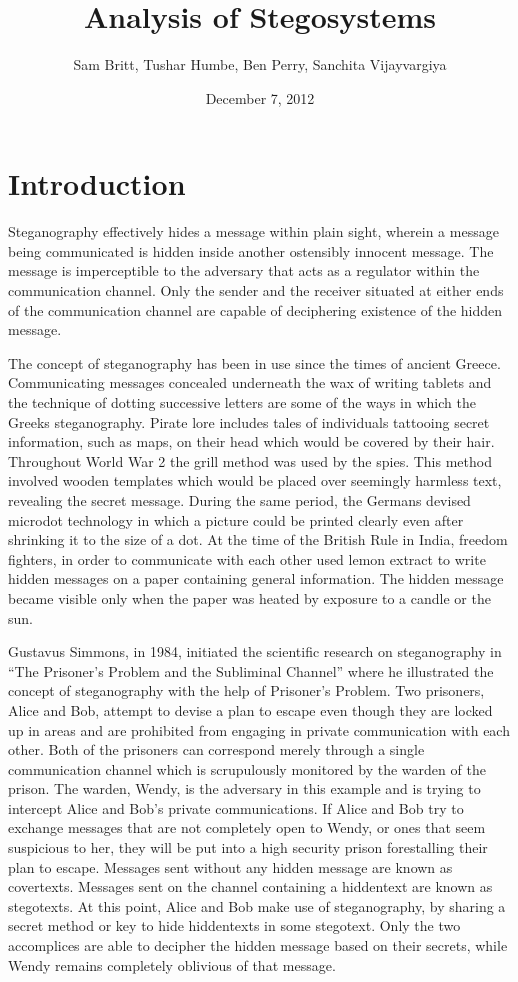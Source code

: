 \documentclass[11pt]{article}
\title{Analysis of Stegosystems}
\author{Sam Britt, Tushar Humbe, Ben Perry, Sanchita Vijayvargiya}
\date{December 7, 2012}
\begin{document}
\maketitle

\section{Introduction}
Steganography effectively hides a message within plain sight, wherein
a message being communicated is hidden inside another ostensibly
innocent message. The message is imperceptible to the adversary that
acts as a regulator within the communication channel. Only the sender
and the receiver situated at either ends of the communication channel
are capable of deciphering existence of the hidden message.

The concept of steganography has been in use since the times of
ancient Greece. Communicating messages concealed underneath the wax of
writing tablets and the technique of dotting successive letters are
some of the ways in which the Greeks steganography. Pirate lore
includes tales of individuals tattooing secret information, such as
maps, on their head which would be covered by their hair. Throughout
World War 2 the grill method was used by the spies. This method
involved wooden templates which would be placed over seemingly
harmless text, revealing the secret message. During the same period,
the Germans devised microdot technology in which a picture could be
printed clearly even after shrinking it to the size of a dot.  At the
time of the British Rule in India, freedom fighters, in order to
communicate with each other used lemon extract to write hidden
messages on a paper containing general information. The hidden message
became visible only when the paper was heated by exposure to a candle
or the sun.

Gustavus Simmons, in 1984, initiated the scientific research on
steganography in ``The Prisoner's Problem and the Subliminal
Channel'' \cite{Simmons1984} where he illustrated the concept of
steganography with the
help of Prisoner's Problem. Two prisoners, Alice and Bob, attempt to
devise a plan to escape even though they are locked up in areas and
are prohibited from engaging in private communication with each other.
Both of the prisoners can correspond merely through a single
communication channel which is scrupulously monitored by the warden of
the prison. The warden, Wendy, is the adversary in this example and is
trying to intercept Alice and Bob's private communications. If Alice
and Bob try to exchange messages that are not completely open to
Wendy, or ones that seem suspicious to her, they will be put into a
high security prison forestalling their plan to escape. Messages sent
without any hidden message are known as covertexts. Messages sent on
the channel containing a hiddentext are known as stegotexts. At this
point, Alice and Bob make use of steganography, by sharing a secret
method or key to hide hiddentexts in some stegotext. Only the two
accomplices are able to decipher the hidden message based on their
secrets, while Wendy remains completely oblivious of that message.
\end{document}
